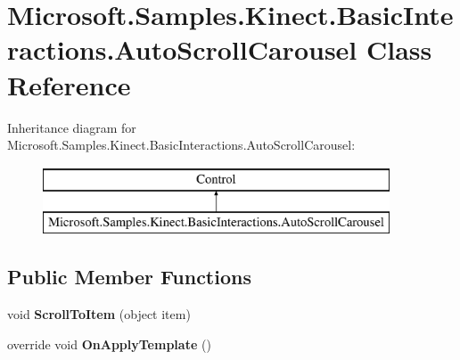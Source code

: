 \hypertarget{class_microsoft_1_1_samples_1_1_kinect_1_1_basic_interactions_1_1_auto_scroll_carousel}{\section{Microsoft.\-Samples.\-Kinect.\-Basic\-Interactions.\-Auto\-Scroll\-Carousel Class Reference}
\label{class_microsoft_1_1_samples_1_1_kinect_1_1_basic_interactions_1_1_auto_scroll_carousel}
}
Inheritance diagram for Microsoft.\-Samples.\-Kinect.\-Basic\-Interactions.\-Auto\-Scroll\-Carousel\-:\begin{figure}[H]
\begin{center}
\leavevmode
\includegraphics[height=2.000000cm]{class_microsoft_1_1_samples_1_1_kinect_1_1_basic_interactions_1_1_auto_scroll_carousel}
\end{center}
\end{figure}
\subsection*{Public Member Functions}
\begin{DoxyCompactItemize}
\item 
\hypertarget{class_microsoft_1_1_samples_1_1_kinect_1_1_basic_interactions_1_1_auto_scroll_carousel_ad161baaa44463956fbf440d241d86f03}{void {\bfseries Scroll\-To\-Item} (object item)}\label{class_microsoft_1_1_samples_1_1_kinect_1_1_basic_interactions_1_1_auto_scroll_carousel_ad161baaa44463956fbf440d241d86f03}

\item 
\hypertarget{class_microsoft_1_1_samples_1_1_kinect_1_1_basic_interactions_1_1_auto_scroll_carousel_af862f3f8633dd196c9df96185ec1f5e6}{override void {\bfseries On\-Apply\-Template} ()}\label{class_microsoft_1_1_samples_1_1_kinect_1_1_basic_interactions_1_1_auto_scroll_carousel_af862f3f8633dd196c9df96185ec1f5e6}

\end{DoxyCompactItemize}
